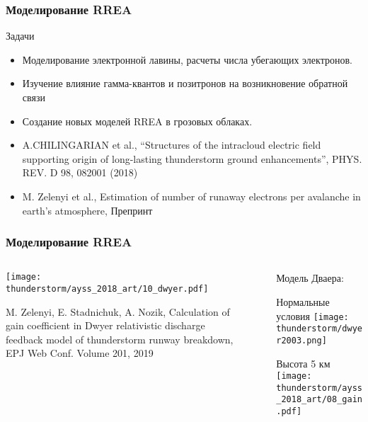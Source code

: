 \begin{frame}
\frametitle{Моделирование RREA}
  \begin{block}{Задачи}
      \begin{itemize}
          \item Моделирование электронной лавины, расчеты числа убегающих электронов.
          \item Изучение влияние гамма-квантов и позитронов на возникновение обратной связи
          \item Создание новых моделей RREA в грозовых облаках.
      \end{itemize}
  \end{block}
{\tiny \begin{itemize}
   \item A.CHILINGARIAN et al., “Structures of the intracloud electric field supporting origin of long-lasting thunderstorm ground enhancements”, PHYS. REV. D 98, 082001 (2018)
   \item M. Zelenyi et al., Estimation of number of runaway electrons per avalanche in earth's atmosphere, Препринт
\end{itemize} }
\end{frame}

\begin{frame}
\frametitle{Моделирование RREA}
\begin{columns}
    \begin{column}{0.5\textwidth}
          \texttt{[image: thunderstorm/ayss\_2018\_art/10\_dwyer.pdf]}
          
          \tiny{M. Zelenyi, E. Stadnichuk, A. Nozik, Calculation of gain coefficient in Dwyer relativistic discharge feedback model of thunderstorm runway breakdown, EPJ Web Conf. Volume 201, 2019}
    \end{column}
    \vline~
    \begin{column}{0.5\textwidth} 
        Модель Дваера:
          \begin{block}{Нормальные условия}
             \texttt{[image: thunderstorm/dwyer2003.png]}
          \end{block}
          \begin{block}{Высота 5 км}
               \texttt{[image: thunderstorm/ayss\_2018\_art/08\_gain.pdf]}
          \end{block}

    \end{column}
\end{columns}  
\end{frame}


